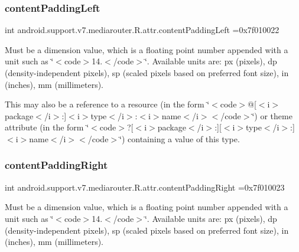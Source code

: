 \subsubsection{\texorpdfstring{content\+Padding\+Left}{contentPaddingLeft}}
{\footnotesize\ttfamily int android.\+support.\+v7.\+mediarouter.\+R.\+attr.\+content\+Padding\+Left =0x7f010022\hspace{0.3cm}{\ttfamily [static]}}

Must be a dimension value, which is a floating point number appended with a unit such as \char`\"{}$<$code$>$14.\+5sp$<$/code$>$\char`\"{}. Available units are\+: px (pixels), dp (density-\/independent pixels), sp (scaled pixels based on preferred font size), in (inches), mm (millimeters). 

This may also be a reference to a resource (in the form \char`\"{}$<$code$>$@\mbox{[}$<$i$>$package$<$/i$>$\+:\mbox{]}$<$i$>$type$<$/i$>$\+:$<$i$>$name$<$/i$>$$<$/code$>$\char`\"{}) or theme attribute (in the form \char`\"{}$<$code$>$?\mbox{[}$<$i$>$package$<$/i$>$\+:\mbox{]}\mbox{[}$<$i$>$type$<$/i$>$\+:\mbox{]}$<$i$>$name$<$/i$>$$<$/code$>$\char`\"{}) containing a value of this type. \mbox{\label{classandroid_1_1support_1_1v7_1_1mediarouter_1_1R_1_1attr_ad77e97d2c06c9038049d3d298e4d171d}} 
\subsubsection{\texorpdfstring{content\+Padding\+Right}{contentPaddingRight}}
{\footnotesize\ttfamily int android.\+support.\+v7.\+mediarouter.\+R.\+attr.\+content\+Padding\+Right =0x7f010023\hspace{0.3cm}{\ttfamily [static]}}

Must be a dimension value, which is a floating point number appended with a unit such as \char`\"{}$<$code$>$14.\+5sp$<$/code$>$\char`\"{}. Available units are\+: px (pixels), dp (density-\/independent pixels), sp (scaled pixels based on preferred font size), in (inches), mm (millimeters). 

